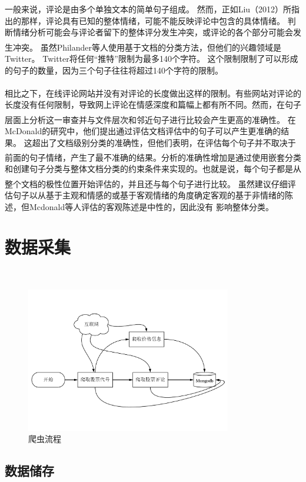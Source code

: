 \documentclass[cs4size,a4paper]{ctexart}
\numberwithin{equation}{section}
\numberwithin{table}{section}
\numberwithin{figure}{section}
\newcommand{\upcite}[1]{\textsuperscript{\textsuperscript{\cite{#1}}}}%
\begin{document}
一般来说，评论是由多个单独文本的简单句子组成。 然而，正如Liu（2012）所指出的那样，评论具有已知的整体情绪，可能不能反映评论中包含的具体情绪。 判断情绪分析可能会与评论者留下的整体评分发生冲突，或评论的各个部分可能会发生冲突。 虽然Philander等人\upcite{philander2016twitter}使用基于文档的分类方法，但他们的兴趣领域是Twitter。 Twitter将任何“推特”限制为最多140个字符。 这个限制限制了可以形成的句子的数量，因为三个句子往往将超过140个字符的限制。

相比之下，在线评论网站并没有对评论的长度做出这样的限制\upcite{sparks2011impact}。有些网站对评论的长度没有任何限制，导致网上评论在情感深度和篇幅上都有所不同。然而，在句子层面上分析这一审查并与文件层次和邻近句子进行比较会产生更高的准确性\upcite{mcdonald2007structured}。 在McDonald的研究中，他们提出通过评估文档评估中的句子可以产生更准确的结果。 这超出了文档级别分类的准确性，但他们表明，在评估每个句子并不取决于前面的句子情绪，产生了最不准确的结果\upcite{mcdonald2007structured}。分析的准确性增加是通过使用嵌套分类和创建句子分类与整体文档分类的约束条件来实现的。也就是说，每个句子都是从整个文档的极性位置开始评估的，并且还与每个句子进行比较。 虽然\upcite{liu2012sentiment}建议仔细评估句子以从基于主观和情感的或基于客观情绪的角度确定客观的基于非情绪的陈述，但Mcdonald等人评估的客观陈述是中性的，因此没有 影响整体分类。

\section{数据采集}~\label{数据采集}

\begin{figure}[thbp!]
  \centering
  \includegraphics[width=0.8\textwidth]{figure/spiderProcess.pdf}
  \caption{爬虫流程}\label{fig:spiderPrecess}
\end{figure}

\subsection{数据储存}
\end{document}
